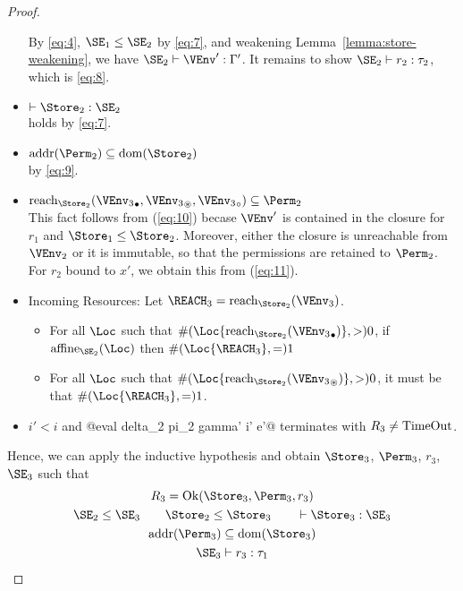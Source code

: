 \begin{proof}
\begin{itemize}
    By \eqref{eq:4}, $\SE_1\le\SE_2$ by \eqref{eq:7}, and weakening
    Lemma~\ref{lemma:store-weakening}, we have
    $\SE_2 \vdash \VEnv' : \E'$.
    It remains to show $\SE_2 \vdash r_2 : \tau_2$, which is
    \eqref{eq:8}.
  \item  $\vdash \Store_2 : \SE_2$\\
    holds by \eqref{eq:7}.
  \item  $\Addresses{\Perm_2} \subseteq \Dom{\Store_2}$\\
    by \eqref{eq:9}.
  \item $\Reach{\Store_2}{\Active{\VEnv_3}, \MutableBorrows{\VEnv_3}, \ImmutableBorrows{\VEnv_3}} \subseteq \Perm_2$\\
    This fact follows from (\ref{eq:10}) becase $\VEnv'$ is contained
    in the closure for $r_1$ and $\Store_1 \le \Store_2$. Moreover,
    either the closure is unreachable from $\VEnv_2$ or it is
    immutable, so that the permissions are retained to $\Perm_2$.
    For $r_2$ bound to $x'$, we obtain this from (\ref{eq:11}).
  \item Incoming Resources: Let $\REACH_3 = \Reach{\Store_2}{\VEnv_3}$.
    \begin{itemize}
    \item
      For all $\Loc$ such that $\MultiNumber\Loc{\Reach{\Store_2}{\Active{\VEnv_3}}} >0$,
      if $\Affine{\SE_2}\Loc$ then $\MultiNumber\Loc{\REACH_3}= 1$
    \item For all $\Loc$ such that $
      \MultiNumber\Loc{\Reach{\Store_2}{\MutableBorrows{\VEnv_3}}} >0$, it
      must be that $\MultiNumber\Loc{\REACH_3}=1$.
    \end{itemize}
  \item $i'<i$ and  @eval delta_2 pi_2 gamma' i' e'@ terminates
    with $R_3 \ne \operatorname{TimeOut}$.
  \end{itemize}
  Hence, we can apply the inductive hypothesis and obtain
  $\Store_3$, $\Perm_3$, $r_3$, $\SE_3$ such that
  \begin{gather}
    R_3 = \Ok{\Store_3, \Perm_3, r_3}
    \\\label{eq:12}
    \SE_2 \le \SE_3 \qquad
    \Store_2 \le \Store_3 \qquad
    \vdash \Store_3 :  \SE_3
    \\\label{eq:13}
    \Addresses{\Perm_3} \subseteq \Dom{\Store_3}
    \\\label{eq:14}
    \SE_3 \vdash r_3 : \tau_1

\end{gather}
\end{proof}
